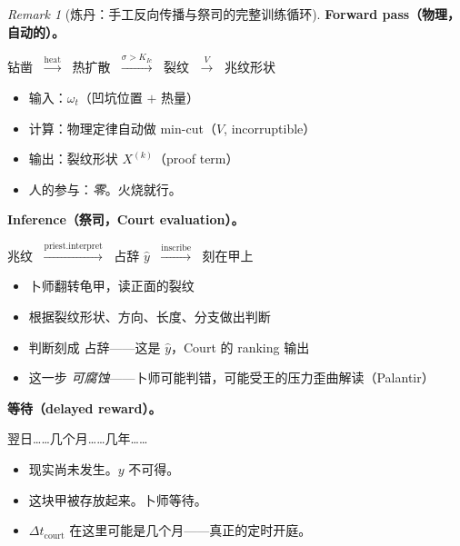 \documentclass[11pt,a4paper]{article}
\theoremstyle{definition}
\theoremstyle{remark}
\newtheorem{remark}[theorem]{Remark}
\begin{document}
\begin{remark}[炼丹：手工反向传播与祭司的完整训练循环]
\textbf{Forward pass（物理，自动的）。}

\begin{center}
{\color{red!70!black} 钻凿} $\;\xrightarrow{\text{heat}}\;$ {\color{orange!80!black} 热扩散} $\;\xrightarrow{\sigma > K_{Ic}}\;$ {\color{blue!70!black} 裂纹} $\;\xrightarrow{V}\;$ {\color{blue!70!black} 兆纹形状}
\end{center}

\begin{itemize}[nosep]
  \item 输入：$\omega_t$（凹坑位置 $+$ 热量）
  \item 计算：物理定律自动做 min-cut（$V$, incorruptible）
  \item 输出：裂纹形状 $X^{(k)}$（proof term）
  \item 人的参与：\emph{零}。火烧就行。
\end{itemize}

\textbf{Inference（祭司，Court evaluation）。}

\begin{center}
{\color{blue!70!black} 兆纹} $\;\xrightarrow{\text{priest.interpret}}\;$ {\color{blue!70!black} 占辞 $\hat{y}$} $\;\xrightarrow{\text{inscribe}}\;$ {\color{blue!70!black} 刻在甲上}
\end{center}

\begin{itemize}[nosep]
  \item 卜师翻转龟甲，读正面的裂纹
  \item 根据裂纹形状、方向、长度、分支做出判断
  \item 判断刻成{\color{blue!70!black} 占辞}——这是 $\hat{y}$，Court 的 ranking 输出
  \item 这一步 \emph{可腐蚀}——卜师可能判错，可能受王的压力歪曲解读（Palantir）
\end{itemize}

\textbf{等待（delayed reward）。}

\begin{center}
{\color{gray!60} 翌日……几个月……几年……}
\end{center}

\begin{itemize}[nosep]
  \item 现实尚未发生。$y$ 不可得。
  \item 这块甲被存放起来。卜师等待。
  \item $\Delta t_{\mathrm{court}}$ 在这里可能是几个月——真正的定时开庭。
\end{itemize}


\end{remark}
\end{document}
